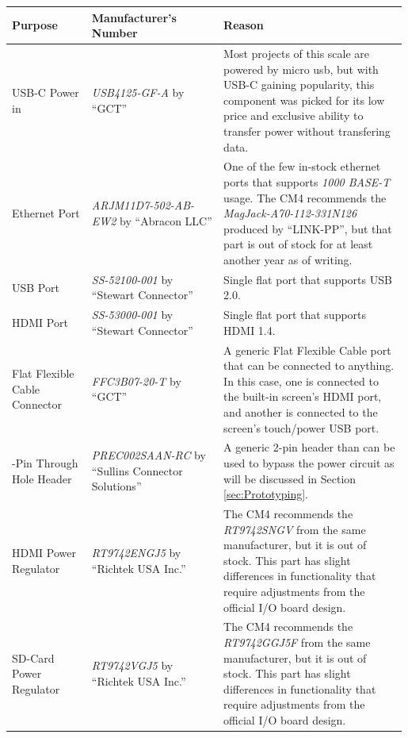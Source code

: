 \renewcommand*{\arraystretch}{1.5} %
\begin{longtable}{|>{\raggedright\arraybackslash}p{0.2\linewidth}|>{\raggedright\arraybackslash}p{0.33\linewidth}|>{\raggedright\arraybackslash}p{0.46\linewidth}|}
  \hline
  \bfseries Purpose & \bfseries Manufacturer's Number &\bfseries Reason \\%
  \hline
  USB-C Power in & \emph{USB4125-GF-A} by \enquote{GCT} & Most projects of this scale are powered by micro usb, but with USB-C gaining popularity, this component was picked for its low price and exclusive ability to transfer power without transfering data. \\
  \hline
  Ethernet Port & \emph{ARJM11D7-502-AB-EW2} by \enquote{Abracon LLC} & One of the few in-stock ethernet ports that supports \emph{1000 BASE-T} usage. The CM4 recommends the \emph{MagJack-A70-112-331N126} produced by \enquote{LINK-PP}, but that part is out of stock for at least another year as of writing. \\
  \hline
  USB Port & \emph{SS-52100-001} by \enquote{Stewart Connector} & Single flat port that supports USB 2.0. \\
  \hline
  HDMI Port & \emph{SS-53000-001} by \enquote{Stewart Connector} & Single flat port that supports HDMI 1.4. \\
  \hline
  Flat Flexible Cable Connector & \emph{FFC3B07-20-T} by \enquote{GCT} & A generic Flat Flexible Cable port that can be connected to anything. In this case, one is connected to the built-in screen's HDMI port, and another is connected to the screen's touch/power USB port. \\
  \hline
  2-Pin Through Hole Header & \emph{PREC002SAAN-RC} by \enquote{Sullins Connector Solutions} & A generic 2-pin header than can be used to bypass the power circuit as will be discussed in Section \ref{sec:Prototyping}. \\
  \hline
  HDMI Power Regulator & \emph{RT9742ENGJ5} by \enquote{Richtek USA Inc.} & The CM4 recommends the \emph{RT9742SNGV} from the same manufacturer, but it is out of stock. This part has slight differences in functionality that require adjustments from the official I/O board design. \\
  \hline
  SD-Card Power Regulator & \emph{RT9742VGJ5} by \enquote{Richtek USA Inc.} & The CM4 recommends the \emph{RT9742GGJ5F} from the same manufacturer, but it is out of stock. This part has slight differences in functionality that require adjustments from the official I/O board design. \\

\end{longtable}
